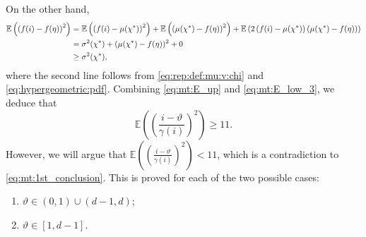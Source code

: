 \documentclass[onecolumn,letterpaper]{IEEEtran}
\newcommand{\cA}{{Z}}
\newcommand{\na}{{a}}
\newcommand{\plsize}{{\chi}}
\newcommand{\mean}{{\mu}}
\newcommand{\var}{{\sigma^{2}}}
\newcommand{\apn}{{\gamma}}
\newcommand{\cE}{{\mathbb{E}}}
\newcommand{\mnp}{{\vartheta}}
\newcommand{\idex}{{i}}
\newcommand{\arb}{{\eta}}
\newcommand{\fna}{{g(I)}}
\begin{document}
On the other hand, 
\begin{align}
    \cE \left(\left( f(\idex) - f(\arb) \right)^2\right)
    &=\cE\left(\left(f(\idex) - \mean(\plsize^{*})\right)^2\right) + \cE\left(\left(\mean(\plsize^{*}) - f(\arb)\right)^2\right) + \cE\left(2 \left(f(\idex) - \mean(\plsize^{*})\right) \left(\mean(\plsize^{*}) - f(\arb)\right)\right) \notag\\
    &= \var(\plsize^{*}) + (\mean(\plsize^{*}) - f(\arb))^2 + 0 \notag\\
    &\ge \var(\plsize^{*}), \label{eq:mt:E_low_3}
\end{align}
where the second line follows from \eqref{eq:rep:def:mu:v:chi} and \eqref{eq:hypergeometric:pdf}.
Combining \eqref{eq:mt:E_up} and \eqref{eq:mt:E_low_3}, we deduce that
\begin{equation} 
\label{eq:mt:1st_conclusion}
    \cE \left( \left(\frac{\idex-\mnp}{\apn(\idex)}\right)^2 \right) \ge 11.
\end{equation}
However, we will argue that $\cE \left( \left(\frac{\idex-\mnp}{\apn(\idex)}\right)^2 \right) < 11$, which is a contradiction to \eqref{eq:mt:1st_conclusion}. This is proved for each of the two possible cases:
\begin{enumerate}[label=\roman*)]
    \item $\mnp \in (0,1)\cup (d-1,d)$; \label{eq:bound:exp:case1}
    \item $\mnp \in[1, d-1]$.\label{eq:bound:exp:case2}
\end{enumerate}
\end{document}
